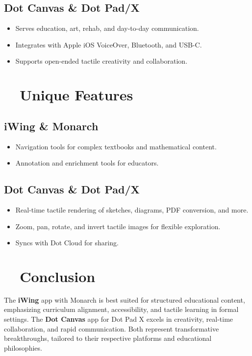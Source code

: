 \subsection{Dot Canvas \& Dot Pad/X}
\begin{itemize}
	\item Serves education, art, rehab, and day-to-day communication.
	\item Integrates with Apple iOS VoiceOver, Bluetooth, and USB-C\supercite{visionaid_dotpad}\supercite{rnib_dotpad}.
	\item Supports open-ended tactile creativity and collaboration.
\end{itemize}

\section{~~Unique Features}

\subsection{iWing \& Monarch}
\begin{itemize}
	\item Navigation tools for complex textbooks and mathematical content\supercite{floridareading_monarch}.
	\item Annotation and enrichment tools for educators.
\end{itemize}

\subsection{Dot Canvas \& Dot Pad/X}
\begin{itemize}
	\item Real-time tactile rendering of sketches, diagrams, PDF conversion, and more\supercite{ces_dotcanvas}.
	\item Zoom, pan, rotate, and invert tactile images for flexible exploration.
	\item Syncs with Dot Cloud for sharing.
\end{itemize}

\section{~~Conclusion}

The \textbf{iWing} app with Monarch is best suited for structured educational content, emphasizing curriculum alignment, accessibility, and tactile learning in formal settings. The \textbf{Dot Canvas} app for Dot Pad X excels in creativity, real-time collaboration, and rapid communication. Both represent transformative breakthroughs, tailored to their respective platforms and educational philosophies.
